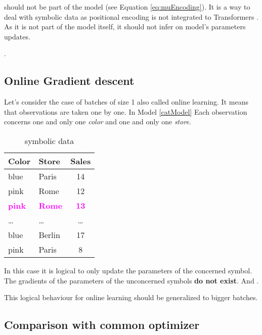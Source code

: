 \ohe should not be part of the model (see Equation \ref{eq:muEncoding}). It is a way to deal with symbolic data as positional encoding is not integrated to Transformers \cite{attentionIsAllYouNeed}. As it is not part of the model itself, it should not infer on model's parameters updates.


\secondContrib.

\subsection{Online Gradient descent}\label{tinyBatch}
Let's consider the case of batches of size 1 also called online learning. It means that observations are taken one by one. In Model \ref{catModel} Each observation concerns one and only one \textit{color} and one and only one \textit{store}.



\begin{table}[h]%
  \caption{symbolic data}
  \begin{footnotesize}
  \begin{center}
  \begin{tabular}{llc}
    \toprule
    Color & Store & Sales \\
    \midrule
    blue  & Paris & 14 \\
    pink  & Rome  & 12 \\
    \textcolor{magenta}{\textbf{pink}}  & \textcolor{magenta}{\textbf{Rome}}     & \textcolor{magenta}{\textbf{13}} \\
    \dots & \dots & \dots \\
    blue  & Berlin    & 17 \\
    pink  & Paris     & 8  \\
  \bottomrule
\end{tabular}
\end{center}
\end{footnotesize}
\end{table}


In this case it is logical to only update the parameters of the concerned symbol. The gradients of the parameters of the unconcerned symbols \textbf{do not exist}. And \mainContrib.

This logical behaviour for online learning should be generalized to bigger batches.

\subsection{Comparison with common optimizer}

